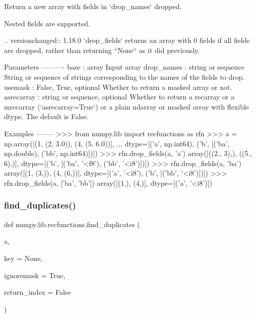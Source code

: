 \begin{DoxyVerb}Return a new array with fields in `drop_names` dropped.

Nested fields are supported.

.. versionchanged:: 1.18.0
    `drop_fields` returns an array with 0 fields if all fields are dropped,
    rather than returning ``None`` as it did previously.

Parameters
----------
base : array
    Input array
drop_names : string or sequence
    String or sequence of strings corresponding to the names of the
    fields to drop.
usemask : {False, True}, optional
    Whether to return a masked array or not.
asrecarray : string or sequence, optional
    Whether to return a recarray or a mrecarray (`asrecarray=True`) or
    a plain ndarray or masked array with flexible dtype. The default
    is False.

Examples
--------
>>> from numpy.lib import recfunctions as rfn
>>> a = np.array([(1, (2, 3.0)), (4, (5, 6.0))],
...   dtype=[('a', np.int64), ('b', [('ba', np.double), ('bb', np.int64)])])
>>> rfn.drop_fields(a, 'a')
array([((2., 3),), ((5., 6),)],
      dtype=[('b', [('ba', '<f8'), ('bb', '<i8')])])
>>> rfn.drop_fields(a, 'ba')
array([(1, (3,)), (4, (6,))], dtype=[('a', '<i8'), ('b', [('bb', '<i8')])])
>>> rfn.drop_fields(a, ['ba', 'bb'])
array([(1,), (4,)], dtype=[('a', '<i8')])
\end{DoxyVerb}
 \mbox{\label{namespacenumpy_1_1lib_1_1recfunctions_a1f60f45e1fe362422c163394be3ad363}} 
\subsubsection{\texorpdfstring{find\+\_\+duplicates()}{find\_duplicates()}}
{\footnotesize\ttfamily def numpy.\+lib.\+recfunctions.\+find\+\_\+duplicates (\begin{DoxyParamCaption}\item[{}]{a,  }\item[{}]{key = {\ttfamily None},  }\item[{}]{ignoremask = {\ttfamily True},  }\item[{}]{return\+\_\+index = {\ttfamily False} }\end{DoxyParamCaption})}


